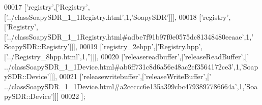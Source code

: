 \begin{DoxyCode}
00017   [\textcolor{stringliteral}{'registry'},[\textcolor{stringliteral}{'Registry'},[\textcolor{stringliteral}{'../classSoapySDR\_1\_1Registry.html'},1,\textcolor{stringliteral}{'SoapySDR'}]]],
00018   [\textcolor{stringliteral}{'registry'},[\textcolor{stringliteral}{'Registry'},[\textcolor{stringliteral}{'../classSoapySDR\_1\_1Registry.html#adbe7f91b97f0e0575dc81348480eeaae'},1,\textcolor{stringliteral}{'
      SoapySDR::Registry'}]]],
00019   [\textcolor{stringliteral}{'registry\_2ehpp'},[\textcolor{stringliteral}{'Registry.hpp'},[\textcolor{stringliteral}{'../Registry\_8hpp.html'},1,\textcolor{stringliteral}{''}]]],
00020   [\textcolor{stringliteral}{'releasereadbuffer'},[\textcolor{stringliteral}{'releaseReadBuffer'},[\textcolor{stringliteral}{'
      ../classSoapySDR\_1\_1Device.html#ab6ff731c8d6a56e48ac2cf3564172ce3'},1,\textcolor{stringliteral}{'SoapySDR::Device'}]]],
00021   [\textcolor{stringliteral}{'releasewritebuffer'},[\textcolor{stringliteral}{'releaseWriteBuffer'},[\textcolor{stringliteral}{'
      ../classSoapySDR\_1\_1Device.html#a2ccccc6e135a399cbc4793897786664a'},1,\textcolor{stringliteral}{'SoapySDR::Device'}]]]
00022 ];
\end{DoxyCode}
